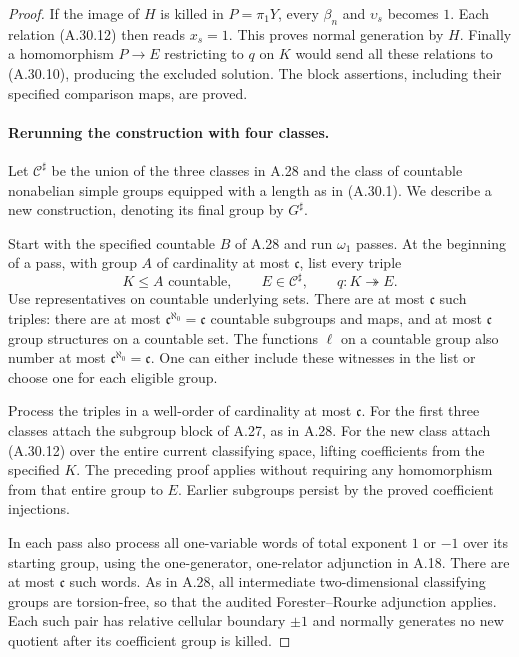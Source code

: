 \begin{proof}
If the image of $H$ is killed in $P=\pi_1Y$, every
$\beta_n$ and $\upsilon_s$ becomes $1$. Each relation
(A.30.12) then reads $x_s=1$. This proves normal
generation by $H$. Finally a homomorphism $P\to E$
restricting to $q$ on $K$ would send all these relations
to (A.30.10), producing the excluded solution. The block
assertions, including their specified comparison maps,
are proved.

\paragraph{Rerunning the construction with four classes.}
Let $\mathcal C^{\sharp}$ be the union of the three
classes in A.28 and the class of countable nonabelian
simple groups equipped with a length as in (A.30.1).
We describe a new construction, denoting its final
group by $G^{\sharp}$.

Start with the specified countable $B$ of A.28 and run
$\omega_1$ passes. At the beginning of a pass, with
group $A$ of cardinality at most $\mathfrak c$, list
every triple
\[
 K\leq A\text{ countable},\qquad
 E\in\mathcal C^{\sharp},\qquad
 q:K\twoheadrightarrow E.
 \tag{A.30.15}
\]
Use representatives on countable underlying sets.
There are at most $\mathfrak c$ such triples: there
are at most $\mathfrak c^{\aleph_0}=\mathfrak c$
countable subgroups and maps, and at most
$\mathfrak c$ group structures on a countable set.
The functions $\ell$ on a countable group also number
at most $\mathfrak c^{\aleph_0}=\mathfrak c$.
One can either include these witnesses in the list or
choose one for each eligible group.

Process the triples in a well-order of cardinality at
most $\mathfrak c$. For the first three classes attach
the subgroup block of A.27, as in A.28. For the new
class attach (A.30.12) over the entire current
classifying space, lifting coefficients from the
specified $K$. The preceding proof applies without
requiring any homomorphism from that entire group
to $E$. Earlier subgroups persist by the proved
coefficient injections.

In each pass also process all one-variable words of
total exponent $1$ or $-1$ over its starting group,
using the one-generator, one-relator adjunction in
A.18. There are at most $\mathfrak c$ such words.
As in A.28, all intermediate two-dimensional
classifying groups are torsion-free, so that the
audited Forester--Rourke adjunction applies. Each
such pair has relative cellular boundary $\pm1$
and normally generates no new quotient after its
coefficient group is killed.


\end{proof}
